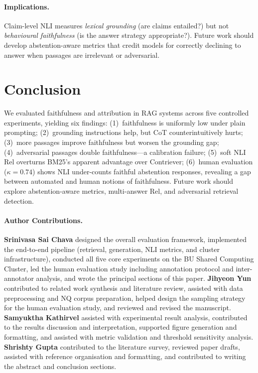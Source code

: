 \documentclass[11pt]{article}
\begin{document}
\paragraph{Implications.}
Claim-level NLI measures \emph{lexical grounding} (are claims entailed?)
but not \emph{behavioural faithfulness} (is the answer strategy appropriate?).
Future work should develop abstention-aware metrics that credit models for
correctly declining to answer when passages are irrelevant or adversarial.

\section{Conclusion}

We evaluated faithfulness and attribution in RAG systems across five
controlled experiments, yielding six findings:
(1)~faithfulness is uniformly low under plain prompting;
(2)~grounding instructions help, but CoT counterintuitively hurts;
(3)~more passages improve faithfulness but worsen the grounding gap;
(4)~adversarial passages double faithfulness---a calibration failure;
(5)~soft NLI Rel overturns BM25's apparent advantage over Contriever;
(6)~human evaluation ($\kappa{=}0.74$) shows NLI under-counts faithful
abstention responses, revealing a gap between automated and human notions
of faithfulness.
Future work should explore abstention-aware metrics, multi-answer Rel,
and adversarial retrieval detection.




\paragraph*{Author Contributions.}\textbf{Srinivasa Sai Chava} designed the overall evaluation framework,
implemented the end-to-end pipeline (retrieval, generation, NLI metrics,
and cluster infrastructure), conducted all five core experiments on the
BU Shared Computing Cluster, led the human evaluation study including
annotation protocol and inter-annotator analysis, and wrote the principal
sections of this paper.
\textbf{Jihyeon Yun} contributed to related work synthesis and literature
review, assisted with data preprocessing and NQ corpus preparation,
helped design the sampling strategy for the human evaluation study,
and reviewed and revised the manuscript.
\textbf{Samyuktha Kathirvel} assisted with experimental result analysis,
contributed to the results discussion and interpretation, supported
figure generation and formatting, and assisted with metric validation
and threshold sensitivity analysis.
\textbf{Shrishty Gupta} contributed to the literature survey, reviewed
paper drafts, assisted with reference organisation and formatting,
and contributed to writing the abstract and conclusion sections.
\end{document}
